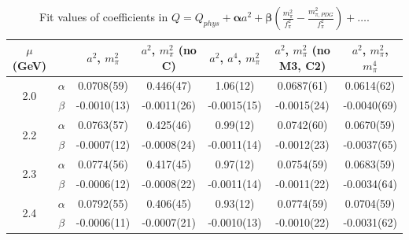 \documentclass[12pt]{extarticle}
\begin{document}
\begin{table}[h!]
\begin{center}
\begin{tabular}{|c c|c|c|c|c|c|}
\hline
$\mu$ (GeV) &  & $a^2$, $m_\pi^2$& $a^2$, $m_\pi^2$ (no C)& $a^2$, $a^4$, $m_\pi^2$& $a^2$, $m_\pi^2$ (no M3, C2)& $a^2$, $m_\pi^2$, $m_\pi^4$\\
\hline
\multirow{2}{0.5in}{2.0} & $\alpha$ & 0.0708(59)& 0.446(47)& 1.06(12)& 0.0687(61)& 0.0614(62)\\
 & $\beta$ & -0.0010(13)& -0.0011(26)& -0.0015(15)& -0.0015(24)& -0.0040(69)\\
\hline
\multirow{2}{0.5in}{2.2} & $\alpha$ & 0.0763(57)& 0.425(46)& 0.99(12)& 0.0742(60)& 0.0670(59)\\
 & $\beta$ & -0.0007(12)& -0.0008(24)& -0.0011(14)& -0.0012(23)& -0.0037(65)\\
\hline
\multirow{2}{0.5in}{2.3} & $\alpha$ & 0.0774(56)& 0.417(45)& 0.97(12)& 0.0754(59)& 0.0683(59)\\
 & $\beta$ & -0.0006(12)& -0.0008(22)& -0.0011(14)& -0.0011(22)& -0.0034(64)\\
\hline
\multirow{2}{0.5in}{2.4} & $\alpha$ & 0.0792(55)& 0.406(45)& 0.93(12)& 0.0774(59)& 0.0704(59)\\
 & $\beta$ & -0.0006(11)& -0.0007(21)& -0.0010(13)& -0.0010(22)& -0.0031(62)\\
\hline
\end{tabular}
\caption{Fit values of coefficients in $Q = Q_{phys} + \mathbf{\alpha} a^2 + \mathbf{\beta}\left(\frac{m_\pi^2}{f_\pi^2}-\frac{m_{\pi,PDG}^2}{f_\pi^2}\right) + \ldots$.}
\end{center}
\end{table}




















\clearpage
\end{document}
